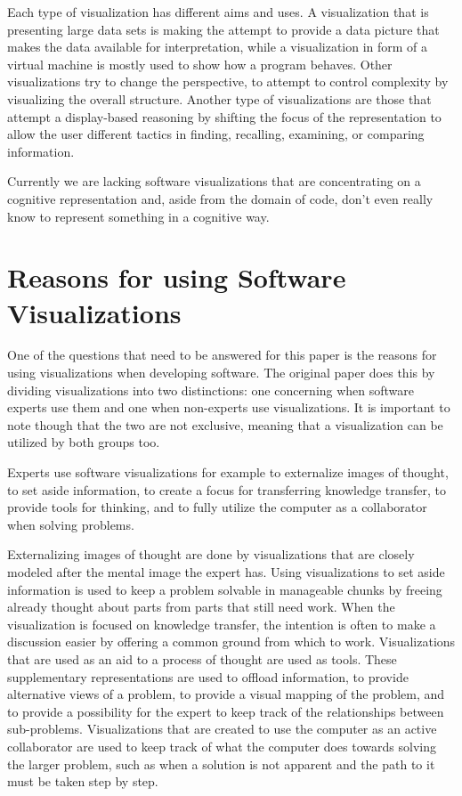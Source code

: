 \documentclass[11pt, a4paper, ngerman, twoside]{article}
\theoremstyle{plain}\newtheorem{Lemma}{Lemma}
\theoremstyle{plain}\newtheorem{Satz}[Lemma]{Satz}
\theoremstyle{definition}\newtheorem{Definition}[Lemma]{Definition}
\theoremstyle{definition}\newtheorem*{Beispiel}{Beispiel}
\theoremstyle{remark}\newtheorem*{Bemerkung}{Bemerkung}
\begin{document}
Each type of visualization has different aims and uses. A visualization that is presenting large data sets is making the attempt to provide a data picture that makes the data available for interpretation, while a visualization in form of a virtual machine is mostly used to show how a program behaves. Other visualizations try to change the perspective, to attempt to control complexity by visualizing the overall structure. Another type of visualizations are those that attempt a display-based reasoning by shifting the focus of the representation to allow the user different tactics in finding, recalling, examining, or comparing information\cite{davies1993}\cite{davies1996}.

Currently we are lacking software visualizations that are concentrating on a cognitive representation and, aside from the domain of code, don't even really know to represent something in a cognitive way.


\section{Reasons for using Software Visualizations}

One of the questions that need to be answered for this paper is the reasons for using visualizations when developing software. The original paper does this by dividing visualizations into two distinctions: one concerning when software experts use them and one when non-experts use visualizations. It is important to note though that the two are not exclusive, meaning that a visualization can be utilized by both groups too.

Experts use software visualizations for example to externalize images of thought, to set aside information, to create a focus for transferring knowledge transfer, to provide tools for thinking, and to fully utilize the computer as a collaborator when solving problems.

Externalizing images of thought are done by visualizations that are closely modeled after the mental image the expert has. Using visualizations to set aside information is used to keep a problem solvable in manageable chunks by freeing already thought about parts from parts that still need work. When the visualization is focused on knowledge transfer, the intention is often to make a discussion easier by offering a common ground from which to work. Visualizations that are used as an aid to a process of thought are used as tools. These supplementary representations are used to offload information, to provide alternative views of a problem, to provide a visual mapping of the problem, and to provide a possibility for the expert to keep track of the relationships between sub-problems. Visualizations that are created to use the computer as an active collaborator are used to keep track of what the computer does towards solving the larger problem, such as when a solution is not apparent and the path to it must be taken step by step.
\end{document}
